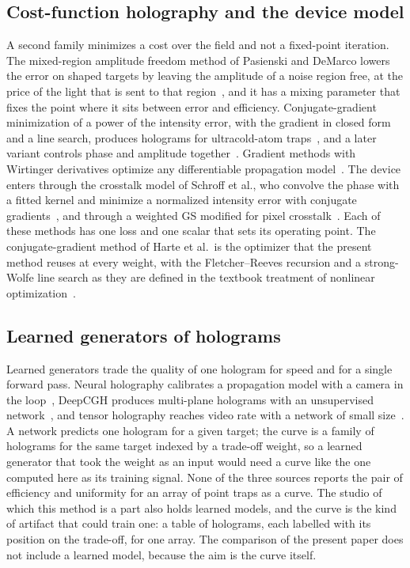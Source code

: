 \subsection{Cost-function holography and the device model}

A second family minimizes a cost over the field and not a fixed-point iteration. The mixed-region amplitude freedom method of Pasienski and DeMarco lowers the error on shaped targets by leaving the amplitude of a noise region free, at the price of the light that is sent to that region~\cite{pasienski}, and it has a mixing parameter that fixes the point where it sits between error and efficiency.
Conjugate-gradient minimization of a power of the intensity error, with the gradient in closed form and a line search, produces holograms for ultracold-atom traps~\cite{harte}, and a later variant controls phase and amplitude together~\cite{bowman}. Gradient methods with Wirtinger derivatives optimize any differentiable propagation model~\cite{chakravarthula}.
The device enters through the crosstalk model of Schroff et al., who convolve the phase with a fitted kernel and minimize a normalized intensity error with conjugate gradients~\cite{schroff}, and through a weighted GS modified for pixel crosstalk~\cite{persson}. Each of these methods has one loss and one scalar that sets its operating point.
The conjugate-gradient method of Harte et al.\ is the optimizer that the present method reuses at every weight, with the Fletcher--Reeves recursion and a strong-Wolfe line search as they are defined in the textbook treatment of nonlinear optimization~\cite{nocedal}.

\subsection{Learned generators of holograms}

Learned generators trade the quality of one hologram for speed and for a single forward pass. Neural holography calibrates a propagation model with a camera in the loop~\cite{peng}, DeepCGH produces multi-plane holograms with an unsupervised network~\cite{eybposh}, and tensor holography reaches video rate
with a network of small size~\cite{shi}. A network predicts one hologram for a given target; the curve is a family of holograms for the same target indexed by a trade-off weight, so a learned generator that took the weight as an input would need a curve like the one computed here as its training signal. None of the three sources reports the pair of efficiency and uniformity for an array of point traps as a curve.
The studio of which this method is a part also holds learned models, and the curve is the kind of artifact that could train one: a table of holograms, each labelled with its position on the trade-off, for one array. The comparison of the present paper does not include a learned model, because the aim is the curve itself.

